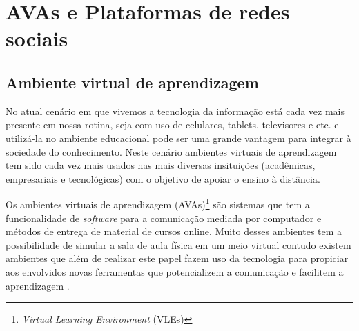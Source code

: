 \chapter{AVAs e Plataformas de redes sociais}
\label{avas-redes-sociais}
% 
\section{Ambiente virtual de aprendizagem}
\label{ava}
% 
No atual cenário em que vivemos a tecnologia da informação está cada vez mais presente em nossa rotina, seja com uso de celulares, tablets, televisores e etc. e utilizá-la no ambiente educacional pode ser uma grande vantagem para integrar à sociedade do conhecimento. Neste cenário ambientes virtuais de aprendizagem tem sido cada vez mais usados nas mais diversas insituições (acadêmicas, empresariais e tecnológicas) com o objetivo de apoiar o ensino à distância.

Os ambientes virtuais de aprendizagem (AVAs)\footnote{\textit{Virtual Learning Environment} (VLEs)} são sistemas que tem a funcionalidade de \textit{software} para a comunicação mediada por computador e métodos de entrega de material de cursos online. Muito desses ambientes tem a possibilidade de simular a sala de aula física em um meio virtual contudo existem ambientes que além de realizar este papel fazem uso da tecnologia para propiciar aos envolvidos novas ferramentas que potencializem a comunicação e facilitem a aprendizagem \cite{schlemmer2005ambiente}.


